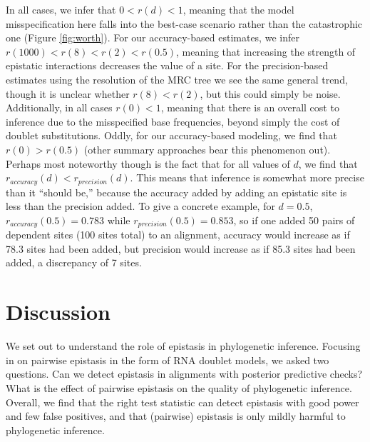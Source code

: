 \documentclass[11pt]{article}
\begin{document}
In all cases, we infer that $0 < r(d) < 1$, meaning that the model misspecification here falls into the best-case scenario rather than the catastrophic one (Figure \ref{fig:worth}).
For our accuracy-based estimates, we infer $r(1000) < r(8) < r(2) < r(0.5)$, meaning that increasing the strength of epistatic interactions decreases the value of a site.
For the precision-based estimates using the resolution of the MRC tree we see the same general trend, though it is unclear whether $r(8) < r(2)$, but this could simply be noise.
Additionally, in all cases $r(0) < 1$, meaning that there is an overall cost to inference due to the misspecified base frequencies, beyond simply the cost of doublet substitutions.
Oddly, for our accuracy-based modeling, we find that $r(0) > r(0.5)$ (other summary approaches bear this phenomenon out).
Perhaps most noteworthy though is the fact that for all values of $d$, we find that $r_{accuracy}(d) < r_{precision}(d)$.
This means that inference is somewhat more precise than it ``should be,'' because the accuracy added by adding an epistatic site is less than the precision added.
To give a concrete example, for $d = 0.5$, $r_{accuracy}(0.5) = 0.783$ while $r_{precision}(0.5) = 0.853$, so if one added 50 pairs of dependent sites (100 sites total) to an alignment, accuracy would increase as if 78.3 sites had been added, but precision would increase as if 85.3 sites had been added, a discrepancy of 7 sites.

\section*{Discussion\label{sec:discussion}}

We set out to understand the role of epistasis in phylogenetic inference.
Focusing in on pairwise epistasis in the form of RNA doublet models, we asked two questions.
Can we detect epistasis in alignments with posterior predictive checks?
What is the effect of pairwise epistasis on the quality of phylogenetic inference.
Overall, we find that the right test statistic can detect epistasis with good power and few false positives, and that (pairwise) epistasis is only mildly harmful to phylogenetic inference.
\end{document}
